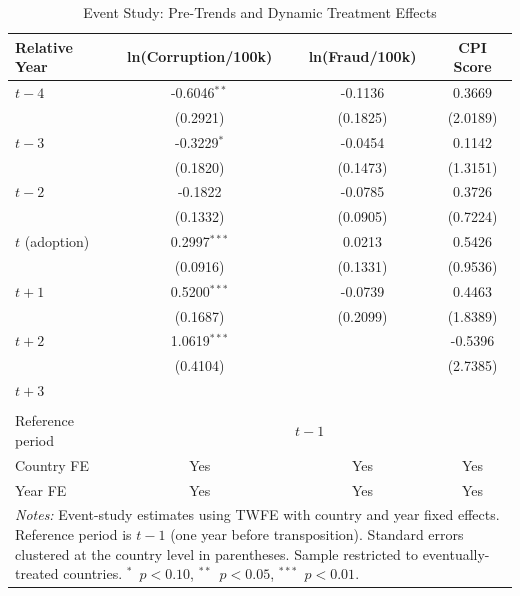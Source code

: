 \begin{table}[htbp]
\centering
\caption{Event Study: Pre-Trends and Dynamic Treatment Effects}
\label{tab:eventstudy}
\begin{tabular}{lccc}
\hline\hline
Relative Year & ln(Corruption/100k) & ln(Fraud/100k) & CPI Score \\
\hline
$t-4$ & -0.6046$^{**}$ & -0.1136 & 0.3669 \\
 & (0.2921) & (0.1825) & (2.0189) \\
$t-3$ & -0.3229$^{*}$ & -0.0454 & 0.1142 \\
 & (0.1820) & (0.1473) & (1.3151) \\
$t-2$ & -0.1822 & -0.0785 & 0.3726 \\
 & (0.1332) & (0.0905) & (0.7224) \\
\hline
$t$ (adoption) & 0.2997$^{***}$ & 0.0213 & 0.5426 \\
 & (0.0916) & (0.1331) & (0.9536) \\
$t+1$ & 0.5200$^{***}$ & -0.0739 & 0.4463 \\
 & (0.1687) & (0.2099) & (1.8389) \\
$t+2$ & 1.0619$^{***}$ &  & -0.5396 \\
 & (0.4104) &  & (2.7385) \\
$t+3$ &  &  &  \\
 &  &  &  \\
\hline
Reference period & \multicolumn{3}{c}{$t-1$} \\
Country FE & Yes & Yes & Yes \\
Year FE & Yes & Yes & Yes \\
\hline\hline
\multicolumn{4}{p{0.85\textwidth}}{\footnotesize \textit{Notes:} Event-study estimates using TWFE with country and year fixed effects. Reference period is $t-1$ (one year before transposition). Standard errors clustered at the country level in parentheses. Sample restricted to eventually-treated countries. $^{*}$~$p<0.10$, $^{**}$~$p<0.05$, $^{***}$~$p<0.01$.} \\
\end{tabular}
\end{table}
